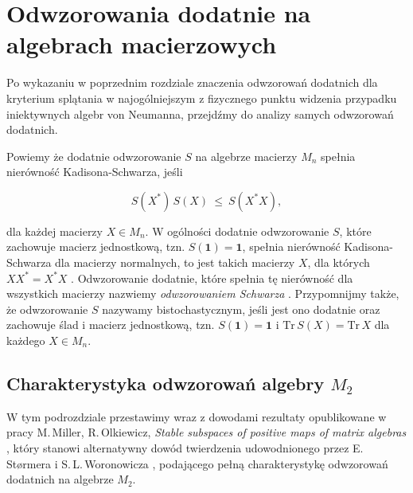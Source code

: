 \chapter{Odwzorowania dodatnie na algebrach macierzowych}
\label{chp:M3notes}

Po wykazaniu w poprzednim rozdziale znaczenia odwzorowań dodatnich dla kryterium
splątania w najogólniejszym z fizycznego punktu widzenia przypadku
iniektywnych algebr von Neumanna, przejdźmy do analizy samych odwzorowań dodatnich.

Powiemy że dodatnie odwzorowanie $S$ na algebrze macierzy $M_{n}$ spełnia nierówność
Kadisona-Schwarza, jeśli
\begin{linenomath*}
 \begin{equation}
\label{eq:SchwarzInequality}
    S(X^{*}) \, S(X) \: \leq \: S(X^{*} X),
 \end{equation}
\end{linenomath*}
dla każdej macierzy $X \in M_{n}$.
W ogólności dodatnie odwzorowanie $S$, które zachowuje macierz jednostkową,
tzn. $S(\mathbf{1}) = \mathbf{1}$,
spełnia nierówność Kadisona-Schwarza dla macierzy normalnych,
to jest takich macierzy
$X$, dla których  $X X^{*} = X^{*} X$
\cite{choi1980some}.
Odwzorowanie dodatnie, które spełnia tę nierówność dla wszystkich macierzy
nazwiemy \emph{odwzorowaniem Schwarza} \cite{robertson1983schwarz}.
Przypomnijmy także, że odwzorowanie $S$ nazywamy bistochastycznym,
jeśli jest ono dodatnie oraz zachowuje ślad i macierz jednostkową,
tzn.
$S(\mathbf{1}) = \mathbf{1}$
i
$\text{Tr} \, S(X) = \text{Tr} \, X$
dla każdego $X \in M_{n}$.


\section{Charakterystyka odwzorowań algebry $M_{2}$}
\label{sec:M2notes}

W tym podrozdziale przestawimy wraz z dowodami rezultaty opublikowane w pracy
M.\,Miller, R.\,Olkiewicz, \emph{Stable subspaces of positive maps of matrix algebras}
\cite{miller2015stable},
który stanowi alternatywny dowód twierdzenia udowodnionego przez
E.\,St{\o}rmera \cite{stormer1963positive}
i S.\,L.\,Woronowicza \cite{woronowicz1976positive},
podającego pełną charakterystykę odwzorowań dodatnich na algebrze $M_{2}$.

